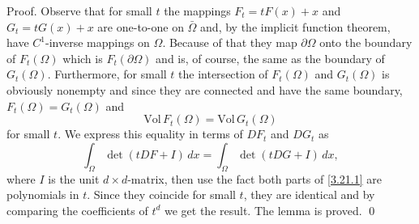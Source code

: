 \documentclass[11pt, reqno]{amsart}
\theoremstyle{remark}
\theoremstyle{definition}
\begin{document}
Proof.
Observe that
 for small $t $ the mappings  
$F_{t}=tF(x)+ x $ and $G_{t}=tG(x)+ x$ are one-to-one
on $\bar\Omega$ and,  by the implicit function theorem,
have $C^{1}$-inverse mappings on $\Omega$.
Because of that they
map $\partial \Omega$ onto the boundary of
$F_{t}(\Omega)$ which is $F_{t}(\partial\Omega)$ and is, of course, the same
as the boundary of $G_{t}(\Omega)$. 
Furthermore, for small $t$ the intersection of
$F_{t}(\Omega)$ and $G_{t}(\Omega)$ is obviously nonempty
and since they are connected and have the same boundary,
$F_{t}(\Omega)=G_{t}(\Omega)$ and
 $$
\text{Vol}\,F_{t}(\Omega)=\text{Vol}\,G_{t}(\Omega)
 $$
for small $t$.
We express this equality in terms of $D F_{t}$ and 
$DG_{t}$ as
\begin{equation}
                                      \label{3.21.1}
\int_{\Omega}\det (tD F+I)\,dx=
\int_{\Omega}\det (tDG+I)\,dx,
\end{equation}
 where $I$ is the unit $d\times d$-matrix,
 then use the fact 
both parts of \eqref{3.21.1} 
are polynomials in $t$. Since they coincide
for small $t$, they are identical
 and by comparing the
coefficients of $t^{d}$ we get the result.
The lemma is proved. \qed

 

 
\end{document}
